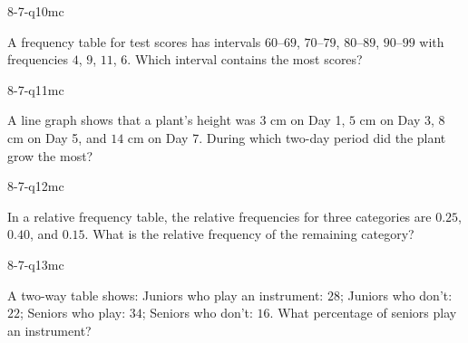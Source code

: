 \begin{practiceQuestion}{8-7-q10}{mc}
\begin{questionText}
A frequency table for test scores has intervals $60$--$69$, $70$--$79$, $80$--$89$, $90$--$99$ with frequencies $4$, $9$, $11$, $6$. Which interval contains the most scores?
\end{questionText}
\end{practiceQuestion}

\begin{practiceQuestion}{8-7-q11}{mc}
\begin{questionText}
A line graph shows that a plant's height was $3$ cm on Day 1, $5$ cm on Day 3, $8$ cm on Day 5, and $14$ cm on Day 7. During which two-day period did the plant grow the most?
\end{questionText}
\end{practiceQuestion}

\begin{practiceQuestion}{8-7-q12}{mc}
\begin{questionText}
In a relative frequency table, the relative frequencies for three categories are $0.25$, $0.40$, and $0.15$. What is the relative frequency of the remaining category?
\end{questionText}
\end{practiceQuestion}

\begin{practiceQuestion}{8-7-q13}{mc}
\begin{questionText}
A two-way table shows: Juniors who play an instrument: $28$; Juniors who don't: $22$; Seniors who play: $34$; Seniors who don't: $16$. What percentage of seniors play an instrument?
\end{questionText}
\end{practiceQuestion}


